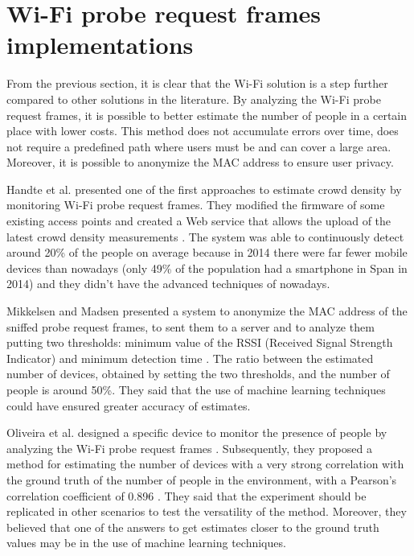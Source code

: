\section{Wi-Fi probe request frames implementations}
\label{sec:probe}
\vspace{0.2 cm}

From the previous section, it is clear that the Wi-Fi solution is a step further compared to other solutions in the literature. By analyzing the Wi-Fi probe request frames, it is possible to better estimate the number of people in a certain place with lower costs. This method does not accumulate errors over time, does not require a predefined path where users must be and can cover a large area. Moreover, it is possible to anonymize the MAC address to ensure user privacy.

Handte et al. presented one of the first approaches to estimate crowd density by monitoring Wi-Fi probe request frames. They modified the firmware of some existing access points and created a Web service that allows the upload of the latest crowd density measurements \cite{handte2014crowd}. The system was able to continuously detect around 20\% of the people on average because in 2014 there were far fewer mobile devices than nowadays (only 49\% of the population had a smartphone in Span in 2014) and they didn't have the advanced techniques of nowadays.

Mikkelsen and Madsen presented a system to anonymize the MAC address of the sniffed probe request frames, to sent them to a server and to analyze them putting two thresholds: minimum value of the RSSI (Received Signal Strength Indicator) and minimum detection time \cite{mikkelsen2016public}. The ratio between the estimated number of devices, obtained by setting the two thresholds, and the number of people is around 50\%. They said that the use of machine learning techniques could have ensured greater accuracy of estimates.

Oliveira et al. designed a specific device to monitor the presence of people by analyzing the Wi-Fi probe request frames \cite{oliveira2018sherlock}. Subsequently, they proposed a method for estimating the number of devices with a very strong correlation with the ground truth of the number of people in the environment, with a Pearson’s correlation coefficient of 0.896 \cite{oliveira2019mobile}. They said that the experiment should be replicated in other scenarios to test the versatility of the method. Moreover, they believed that one of the answers to get estimates closer to the ground truth values may be in the use of machine learning techniques.


